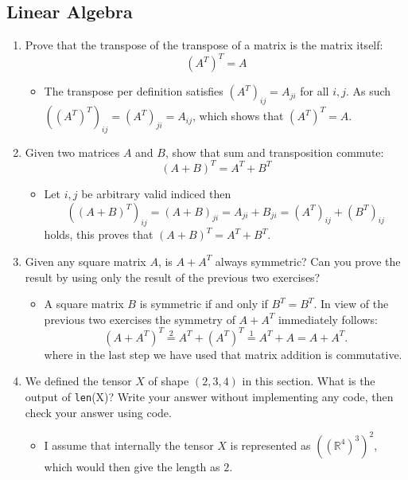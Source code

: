 \documentclass{article}
\begin{document}
\subsection{Linear Algebra}
\begin{enumerate}
    \item Prove that the transpose of the transpose of a matrix is the matrix itself: \\
    $$(A^T)^T = A$$
    	\begin{itemize}
    		\item The transpose per definition satisfies $(A^T)_{ij} = A_{ji}$ for all $i, j$. As such $((A^T)^T)_{ij} = (A^T)_{ji} = A_{ij}$, which shows that $(A^T)^T = A$.
    	\end{itemize}

    \item Given two matrices $A$ and $B$, show that sum and transposition commute: \\
    $$(A + B)^T = A^T + B^T$$
    	\begin{itemize}
    		\item Let $i, j$ be arbitrary valid indiced then
    		$$((A + B)^T)_{ij} = (A + B)_{ji} = A_{ji} + B_{ji} = (A^T)_{ij} + (B^T)_{ij}$$
    		holds, this proves that $(A + B)^T = A^T + B^T$.
    	\end{itemize}

    \item Given any square matrix $A$, is $A + A^T$ always symmetric? Can you prove the result by using only the result of the previous two exercises?
    	\begin{itemize}
    		\item A square matrix $B$ is symmetric if and only if $B^T = B^T$. In view of the previous two exercises the symmetry of $A + A^T$ immediately follows:
    		$$
    		(A + A^T)^T \overset{2}{=} A^T + (A^T)^T \overset{1}{=} A^T + A = A + A^T.
    		$$ 
    		where in the last step we have used that matrix addition is commutative.
    	\end{itemize}

    \item We defined the tensor $X$ of shape $(2, 3, 4)$ in this section. What is the output of \texttt{len}(X)? Write your answer without implementing any code, then check your answer using code.
    	\begin{itemize}
    		\item I assume that internally the tensor $X$ is represented as $((\mathbb{R}^4)^3)^2$, which would then give the length as $2$.
    	\end{itemize}


\end{enumerate}
\end{document}
